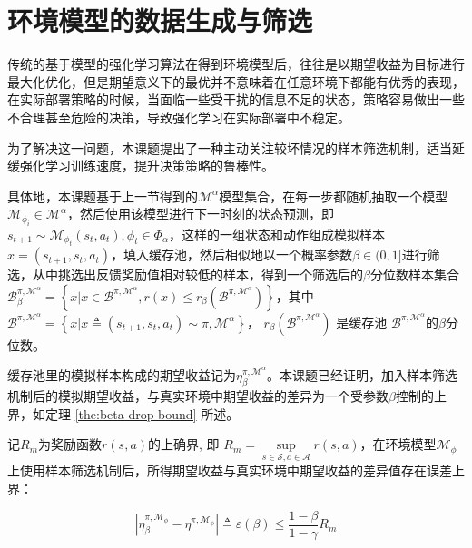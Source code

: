 \section{环境模型的数据生成与筛选}\label{sec:rollout-method}

传统的基于模型的强化学习算法在得到环境模型后，往往是以期望收益为目标进行最大化优化，但是期望意义下的最优并不意味着在任意环境下都能有优秀的表现，在实际部署策略的时候，当面临一些受干扰的信息不足的状态，策略容易做出一些不合理甚至危险的决策，导致强化学习在实际部署中不稳定。

为了解决这一问题，本课题提出了一种主动关注较坏情况的样本筛选机制，适当延缓强化学习训练速度，提升决策策略的鲁棒性。

具体地，本课题基于上一节得到的$\mathcal{M}^{\alpha}$模型集合，在每一步都随机抽取一个模型$\mathcal{M}_{\phi_i}\in\mathcal{M}^\alpha$，然后使用该模型进行下一时刻的状态预测，即$s_{t+1}\sim \mathcal{M}_{\phi_t}(s_t,a_t), \phi_t\in\Phi_\alpha$，这样的一组状态和动作组成模拟样本$x=\left(s_{t+1},s_t,a_t\right)$，填入缓存池，然后相似地以一个概率参数$\beta\in(0,1]$进行筛选，从中挑选出反馈奖励值相对较低的样本，得到一个筛选后的$\beta$分位数样本集合$\mathcal{B}_\beta^{\pi,\mathcal{M}^\alpha}=\left\{x|x\in\mathcal{B}^{\pi,\mathcal{M}^\alpha},r(x)\leq r_\beta(\mathcal{B}^{\pi,\mathcal{M}^\alpha})\right\}$，其中$\mathcal{B}^{\pi,\mathcal{M}^\alpha}=\left\{x|x\triangleq\left(s_{t+1},s_t,a_t\right)\sim\pi,\mathcal{M}^\alpha\right\}$， $r_\beta(\mathcal{B}^{\pi,\mathcal{M}^\alpha})$ 是缓存池 $\mathcal{B}^{\pi,\mathcal{M}^\alpha}$的$\beta$分位数。

缓存池里的模拟样本构成的期望收益记为$\eta^{\pi,\mathcal{M}^\alpha}_\beta$。本课题已经证明，加入样本筛选机制后的模拟期望收益，与真实环境中期望收益的差异为一个受参数$\beta$控制的上界，如定理 \ref{the:beta-drop-bound} 所述。

\begin{theorem}\label{the:beta-drop-bound}

记$R_{m}$为奖励函数$r(s,a)$的上确界, 即 $R_{m}=\underset{s\in\mathcal{S},a\in\mathcal{A}}{\sup}r(s,a)$，在环境模型$\mathcal{M}_\phi$上使用样本筛选机制后，所得期望收益与真实环境中期望收益的差异值存在误差上界：

\begin{equation}
    |\eta_\beta^{\pi, \mathcal{M}_{\phi}} - \eta^{\pi,\mathcal{M}_{\phi}}| \triangleq \varepsilon(\beta) \leq \frac{1-\beta}{1-\gamma}R_{m}
\label{eq:eps-beta}
\end{equation}

\end{theorem}

